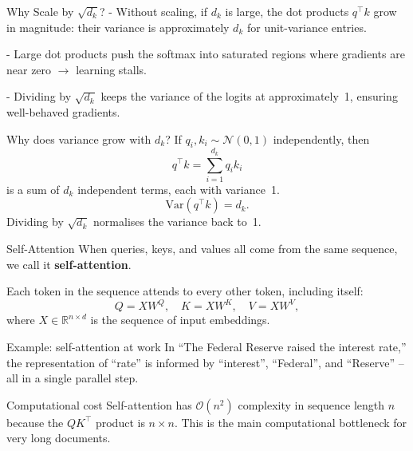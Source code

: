 \documentclass[aspectratio=169]{beamer}
\begin{document}
%
%
\begin{frame}{Why Scale by $\sqrt{d_k}$?}
\small
  - Without scaling, if $d_k$ is large, the dot products $q^\top k$ grow in magnitude:
  their variance is approximately $d_k$ for unit-variance entries.

  - Large dot products push the softmax into saturated regions where gradients are near
  zero $\to$ learning stalls.

  - Dividing by $\sqrt{d_k}$ keeps the variance of the logits at approximately~1,
  ensuring well-behaved gradients.

  \begin{block}{Why does variance grow with $d_k$?}
    If $q_i, k_i \sim \mathcal{N}(0,1)$ independently, then
    \[
      q^\top k = \sum_{i=1}^{d_k} q_i k_i
    \]
    is a sum of $d_k$ independent terms, each with variance~1.
    \[
      \mathrm{Var}(q^\top k) = d_k.
    \]
    Dividing by $\sqrt{d_k}$ normalises the variance back to~1.
  \end{block}
\end{frame}
%
%
\begin{frame}{Self-Attention}
  When queries, keys, and values all come from the same sequence, we call it
  \textbf{self-attention}.

  Each token in the sequence attends to every other token, including itself:
  \[
    Q = XW^Q, \quad K = XW^K, \quad V = XW^V,
  \]
  where $X \in \mathbb{R}^{n \times d}$ is the sequence of input embeddings.

  \begin{exampleblock}{Example: self-attention at work}
    In ``The Federal Reserve raised the interest rate,'' the representation of ``rate''
    is informed by ``interest'', ``Federal'', and ``Reserve'' – all in a single
    parallel step.
  \end{exampleblock}

  \begin{alertblock}{Computational cost}
    Self-attention has $\mathcal{O}(n^2)$ complexity in sequence length $n$ because the
    $QK^\top$ product is $n \times n$.  This is the main computational bottleneck for
    very long documents.
  \end{alertblock}
\end{frame}
%
%
\end{document}
